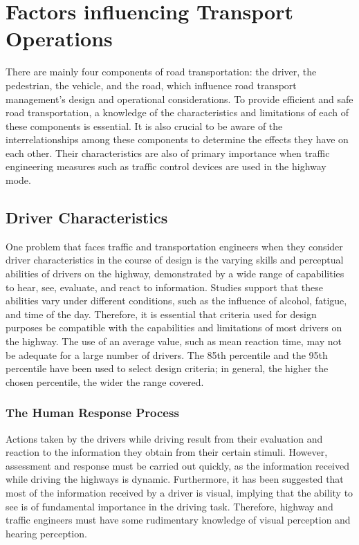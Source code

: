 \section{Factors influencing Transport Operations}
\par
There are mainly four components of road transportation: the driver, the pedestrian, the vehicle, and the road, which influence road transport management's design and operational considerations. To provide efficient and safe road transportation, a knowledge of the characteristics and limitations of each of these components is essential. It is also crucial to be aware of the interrelationships among these components to determine the effects they have on each other. Their characteristics are also of primary importance when traffic engineering measures such as traffic control devices are used in the highway mode.
\subsection{Driver Characteristics}
\par
One problem that faces traffic and transportation engineers when they consider driver characteristics in the course of design is the varying skills and perceptual abilities of drivers on the highway, demonstrated by a wide range of capabilities to hear, see, evaluate, and react to information. Studies support that these abilities vary under different conditions, such as the influence of alcohol, fatigue, and time of the day. Therefore, it is essential that criteria used for design purposes be compatible with the capabilities and limitations of most drivers on the highway. The use of an average value, such as mean reaction time, may not be adequate for a large number of drivers. The 85th percentile and the 95th percentile have been used to select design criteria; in general, the higher the chosen percentile, the wider the range covered.
\subsubsection{The Human Response Process}
Actions taken by the drivers while driving result from their evaluation and reaction to the information they obtain from their certain stimuli. However, assessment and response must be carried out quickly, as the information received while driving the highways is dynamic. Furthermore, it has been suggested that most of the information received by a driver is visual, implying that the ability to see is of fundamental importance in the driving task. Therefore, highway and traffic engineers must have some rudimentary knowledge of visual perception and hearing perception.
%
